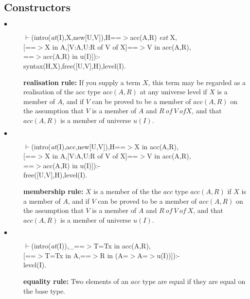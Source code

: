 \documentclass[11pt]{report}
\begin{document}
 \subsection{Constructors}
  
 \begin{description}
 \item[$\bullet$]
\begin{sf}\begin{tabbing}
$\vdash$(intro(\mbox{\it at}(I),X,new[U,V]),H==$>$acc(A,R) \mbox{\it ext} X,\\[-0.15ex]
\hspace{2em}[==$>$X in A,[V:A,U:R of V of X]==$>$V in acc(A,R),\\[-0.15ex]
\hspace{2em}==$>$acc(A,R) in u(I)]):-\\[-0.15ex]
\hspace{2em}syntax(H,X),free([U,V],H),level(I).
\end{tabbing}\end{sf}

 {\bf realisation rule:} If you supply a term $X$, this term may be regarded
 as a realisation of the acc type $acc(A,R)$ at any universe level if $X$
 is a member of $A$, and if $V$ can be proved to be a member of $acc(A,R)$
 on the assumption that $V$ is a member of $A$ and $R\ of\ V\ of X$, and that
 $acc(A,R)$ is a member of universe $u(I)$.
 \item[$\bullet$]
\begin{sf}\begin{tabbing}
$\vdash$(intro(\mbox{\it at}(I),acc,new[U,V]),H==$>$X in acc(A,R), \\[-0.15ex]
\hspace{2em}[==$>$X in A,[V:A,U:R of V of X]==$>$V in acc(A,R),\\[-0.15ex]
\hspace{2em}==$>$acc(A,R) in u(I)]):-\\[-0.15ex]
\hspace{2em}free([U,V],H),level(I).
\end{tabbing}\end{sf}

 {\bf membership rule:} $X$ is a member of the the $acc$ type $acc(A,R)$
 if $X$ is a member of $A$, and if $V$ can be proved to be a member of
 $acc(A,R)$ on the assumption that $V$ is a member of $A$ and
 $R\ of\ V\ of\ X$, and that $acc(A,R)$ is a member of universe $u(I)$.
 \item[$\bullet$]
\begin{sf}\begin{tabbing}
$\vdash$(intro(\mbox{\it at}(I)),\_\hspace{0.1em}==$>$T=Tx in acc(A,R),\\[-0.15ex]
\hspace{2em}[==$>$T=Tx in A,==$>$R in (A=$>$A=$>$u(I))]):-\\[-0.15ex]
\hspace{2em}level(I).
\end{tabbing}\end{sf}

 {\bf equality rule:} Two elements of an $acc$ type are
 equal if they are equal on the base type.
 \end{description}
  
\end{document}
